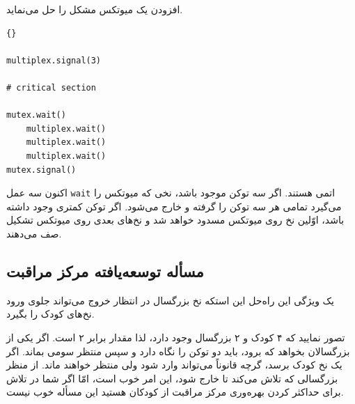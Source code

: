 \documentclass{book}
\begin{document}
    افزودن یک میوتکس مشکل را حل می‌نماید. 

\begin{latin}
\begin{lstlisting}[title=\rl{راه‌حل مرکز مراقبت از کودکان (بزرگسال)}]{}
     
multiplex.signal(3)

# critical section

mutex.wait()
    multiplex.wait()
    multiplex.wait()
    multiplex.wait()
mutex.signal()
\end{lstlisting}
\end{latin}

    اکنون سه عمل {\tt wait} اتمی هستند. اگر سه توکن موجود باشد، نخی که میوتکس را می‌گیرد تمامی هر سه توکن را گرفته و خارج می‌شود. 
    اگر  توکن کمتری وجود داشته باشد، اوّلین نخ روی میوتکس مسدود خواهد شد و نخ‌های بعدی روی میوتکس تشکیل صف می‌دهند. 

\subsection {مسأله توسعه‌یافته مرکز مراقبت}

    یک ویژگی این راه‌حل این استکه نخ بزرگسال در انتظار خروج می‌تواند جلوی ورود نخ‌های کودک را بگیرد. 

    تصور نمایید که ۴ کودک و ۲ بزرگسال وجود دارد، لذا مقدار  برابر ۲ است. اگر یکی از بزرگسالان بخواهد که برود، باید دو توکن 
    را نگاه دارد و سپس منتظر سومی بماند. اگر یک نخ کودک برسد، گرچه قانوناً می‌تواند وارد شود ولی منتظر خواهند ماند. 
    از منظر بزرگسالی که تلاش می‌کند تا خارج شود، این امر خوب است، امّا اگر شما در تلاش برای حداکثر کردن بهره‌وری مرکز مراقبت از کودکان هستید 
    این مسأله خوب نیست. 
\end{document}
